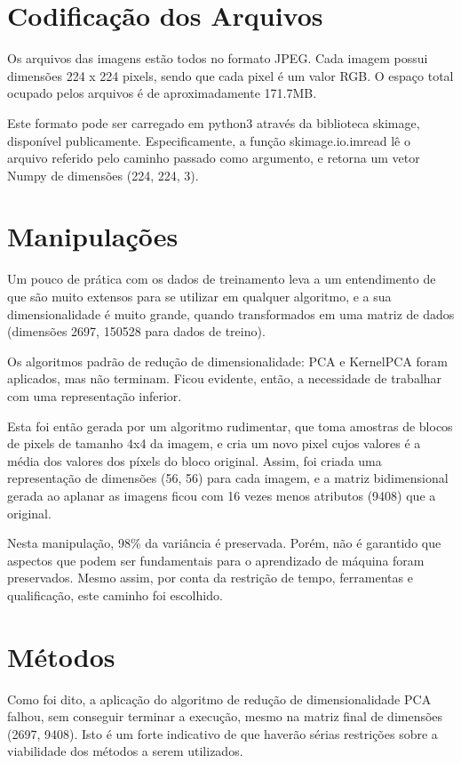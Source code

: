 \documentclass[12pt,oneside,a4paper]{article}
\begin{document}
\section{Codificação dos Arquivos}

Os arquivos das imagens estão todos no formato JPEG. Cada imagem possui dimensões 224 x 224 pixels, sendo que cada pixel é um valor RGB. O espaço total ocupado pelos arquivos é de aproximadamente 171.7MB.

Este formato pode ser carregado em python3 através da biblioteca skimage, disponível publicamente. Especificamente, a função skimage.io.imread lê o arquivo referido pelo caminho passado como argumento, e retorna um vetor Numpy de dimensões (224, 224, 3).

\section{Manipulações}
\label{sec:manip}

Um pouco de prática com os dados de treinamento leva a um entendimento de que são muito extensos para se utilizar em qualquer algoritmo, e a sua dimensionalidade é muito grande, quando transformados em uma matriz de dados (dimensões 2697, 150528 para dados de treino).

Os algoritmos padrão de redução de dimensionalidade: PCA e KernelPCA foram aplicados, mas não terminam. Ficou evidente, então, a necessidade de trabalhar com uma representação inferior.

Esta foi então gerada por um algoritmo rudimentar, que toma amostras de blocos de pixels de tamanho 4x4 da imagem, e cria um novo pixel cujos valores é a média dos valores dos píxels do bloco original. Assim, foi criada uma representação de dimensões (56, 56) para cada imagem, e a matriz bidimensional gerada ao aplanar as imagens ficou com 16 vezes menos atributos (9408) que a original.

Nesta manipulação, 98\% da variância é preservada. Porém, não é garantido que aspectos que podem ser fundamentais para o aprendizado de máquina foram preservados. Mesmo assim, por conta da restrição de tempo, ferramentas e qualificação, este caminho foi escolhido.

\section{Métodos}

Como foi dito, a aplicação do algoritmo de redução de dimensionalidade PCA falhou, sem conseguir terminar a execução, mesmo na matriz final de dimensões (2697, 9408). Isto é um forte indicativo de que haverão sérias restrições sobre a viabilidade dos métodos a serem utilizados.
\end{document}
